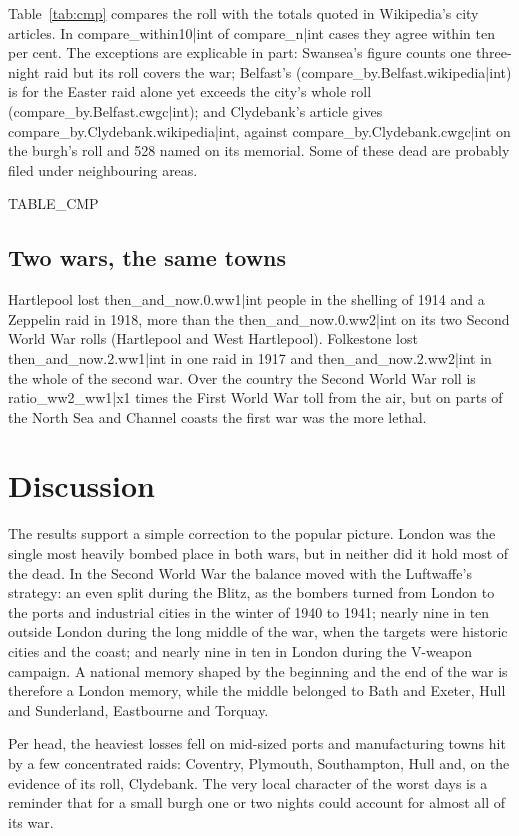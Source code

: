 \documentclass[11pt,a4paper]{article}
\begin{document}
Table~\ref{tab:cmp} compares the roll with the totals quoted in Wikipedia's city articles. In {{compare_within10|int}} of {{compare_n|int}} cases they agree within ten per cent. The exceptions are explicable in part: Swansea's figure counts one three-night raid but its roll covers the war; Belfast's ({{compare_by.Belfast.wikipedia|int}}) is for the Easter raid alone yet exceeds the city's whole roll ({{compare_by.Belfast.cwgc|int}}); and Clydebank's article gives {{compare_by.Clydebank.wikipedia|int}}, against {{compare_by.Clydebank.cwgc|int}} on the burgh's roll and 528 named on its memorial. Some of these dead are probably filed under neighbouring areas.

{{TABLE_CMP}}

\subsection{Two wars, the same towns}

Hartlepool lost {{then_and_now.0.ww1|int}} people in the shelling of 1914 and a Zeppelin raid in 1918, more than the {{then_and_now.0.ww2|int}} on its two Second World War rolls (Hartlepool and West Hartlepool). Folkestone lost {{then_and_now.2.ww1|int}} in one raid in 1917 and {{then_and_now.2.ww2|int}} in the whole of the second war. Over the country the Second World War roll is {{ratio_ww2_ww1|x1}} times the First World War toll from the air, but on parts of the North Sea and Channel coasts the first war was the more lethal.

\section{Discussion}

The results support a simple correction to the popular picture. London was the single most heavily bombed place in both wars, but in neither did it hold most of the dead. In the Second World War the balance moved with the Luftwaffe's strategy: an even split during the Blitz, as the bombers turned from London to the ports and industrial cities in the winter of 1940 to 1941; nearly nine in ten outside London during the long middle of the war, when the targets were historic cities and the coast; and nearly nine in ten in London during the V-weapon campaign. A national memory shaped by the beginning and the end of the war is therefore a London memory, while the middle belonged to Bath and Exeter, Hull and Sunderland, Eastbourne and Torquay.

Per head, the heaviest losses fell on mid-sized ports and manufacturing towns hit by a few concentrated raids: Coventry, Plymouth, Southampton, Hull and, on the evidence of its roll, Clydebank. The very local character of the worst days is a reminder that for a small burgh one or two nights could account for almost all of its war.
\end{document}
